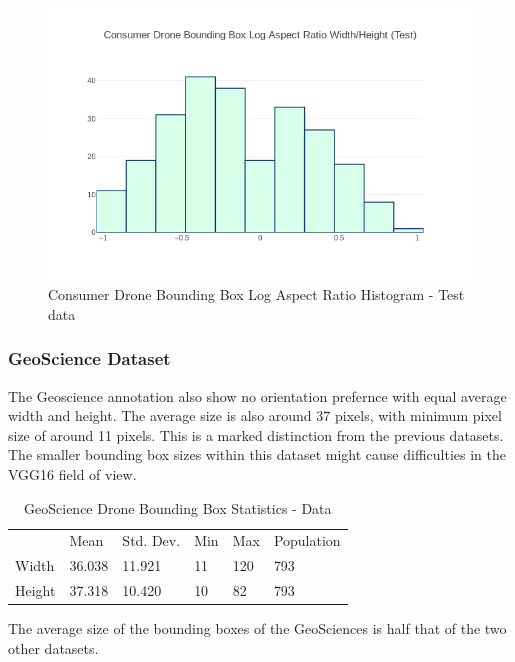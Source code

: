 \documentclass{article}
\begin{document}
\begin{figure}[H]
\centering
\label{consumerdronetestaspect}
\includegraphics[scale=0.4]{images/test-aspect.png}
\caption{Consumer Drone Bounding Box Log Aspect Ratio Histogram - Test data}
\end{figure}


\subsubsection{GeoScience Dataset}

The Geoscience annotation also show no orientation prefernce with equal average width and height. The average size is also around 37 pixels, with minimum pixel size of around 11 pixels. This is a marked distinction from the previous datasets. The smaller bounding box sizes within this dataset might cause difficulties in the VGG16 field of view.

\begin{table}[ht]
\caption{GeoScience Drone Bounding Box Statistics - Data}
\centering
\begin{tabular}{llllll}
       & Mean   & Std. Dev. & Min & Max & Population\\
Width  & 36.038 & 11.921 & 11 & 120 & 793 \\
Height & 37.318 & 10.420 & 10 & 82 & 793
\end{tabular}
\end{table}

The average size of the bounding boxes of the GeoSciences is half that of the two other datasets. 
\end{document}
